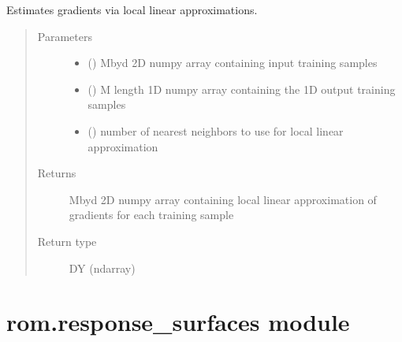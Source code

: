 \documentclass[letterpaper,10pt,english]{sphinxmanual}
\begin{document}
\begin{fulllineitems}
\label{\detokenize{rom:rom.gradients.local_linear_gradients}}
\sphinxAtStartPar
Estimates gradients via local linear approximations.
\begin{quote}\begin{description}
\item[{Parameters}] \leavevmode\begin{itemize}
\item {} 
\sphinxAtStartPar
{} () \textendash{} M\sphinxhyphen{}by\sphinxhyphen{}d 2D numpy array containing input training samples

\item {} 
\sphinxAtStartPar
{} () \textendash{} M length 1D numpy array containing the 1D output training samples

\item {} 
\sphinxAtStartPar
{} () \textendash{} number of nearest neighbors to use for local linear approximation

\end{itemize}

\item[{Returns}] \leavevmode
\sphinxAtStartPar
M\sphinxhyphen{}by\sphinxhyphen{}d 2D numpy array containing local linear approximation of gradients for each training sample

\item[{Return type}] \leavevmode
\sphinxAtStartPar
DY (ndarray)

\end{description}\end{quote}

\end{fulllineitems}



\section{rom.response\_surfaces module}
\label{\detokenize{rom:module-rom.response_surfaces}}\label{\detokenize{rom:rom-response-surfaces-module}}
\end{document}
